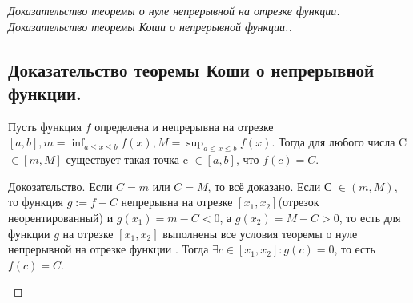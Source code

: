 \begin{proof}[Доказательство теоремы о нуле непрерывной на отрезке функции. Доказательство теоремы Коши о непрерывной функции.]
    \subsection*{Доказательство теоремы Коши о непрерывной функции.}
    \begin{note}[amber]
        Пусть функция $f$ определена и непрерывна на отрезке $[a,b], m = \displaystyle{}\inf_{a \leq x\leq b} f(x), M = \displaystyle{}\sup_{a\leq x \leq b} f(x).$ Тогда для любого
        числа C $\in [m,M]$ существует такая точка c $\in [a,b]$, что $f(c) = C.$\\
        \begin{note}[purple]
           Докозательство. Если $C = m$ или $C = M$, то всё доказано. Если С $\in (m,M)$, то функция $g:= f - C$ непрерывна на отрезке $[x_1,x_2]$(отрезок неорентированный) и $g(x_1) = m - C < 0$, а $g(x_2) = M - C > 0$, то есть для функции $g$ на отрезке $[x_1,x_2]$ выполнены все условия теоремы  о нуле непрерывной на отрезке функции
           . Тогда $\exists c \in [x_1,x_2] : g(c) = 0$, то есть $f(c) = C$.
        \end{note}
    \end{note}
\end{proof}
